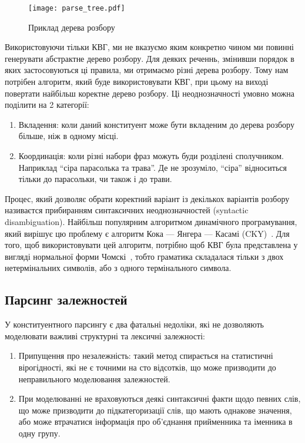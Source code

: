 \begin{wrapfigure}{r}{0.3\textwidth}
 \texttt{[image: parse\_tree.pdf]} 
  \caption{Приклад дерева розбору}
  \label{text:parse_tree}
\end{wrapfigure}

Використовуючи тільки КВГ, ми не вказуємо яким конкретно чином ми повинні генерувати
абстрактне дерево розбору. Для деяких реченнь, змінивши порядок в яких застосовуються ці
правила, ми отримаємо різні дерева розбору. Тому нам потрібен алгоритм, який буде 
використовувати КВГ, при цьому на виході повертати найбільш коректне дерево розбору.
Ці неоднозначності умовно можна поділити на 2 категорії:
\begin{enumerate}
    \item Вкладення: коли даний конституент може бути вкладеним до дерева розбору
    більше, ніж в одному місці.
    \item Координація: коли різні набори фраз можуть буди розділені сполучником.
    Наприклад ``сіра парасолька та трава''. Де не зрозуміло, ``сіра'' відноситься
    тільки до парасольки, чи також і до трави.
\end{enumerate}

Процес, який дозволяє обрати коректний варіант із декількох варіантів розбору називаєтся
прибиранням синтаксичних неоднозначностей (syntactic disambiguation). Найбільш
популярним алгоритмом динамічного програмування, який вирішує цю проблему є
алгоритм Кока — Янгера — Касамі (CKY)~\cite{bib6}. Для того, щоб
використовувати цей алгоритм, потрібно щоб КВГ була представлена у вигляді
нормальної форми Чомскі~\cite{bib7}, тобто граматика складалася тільки
з двох нетермінальних символів, або з одного термінального символа.

\subsection{Парсинг залежностей}
У конституентного парсингу є два фатальні недоліки, які не дозволяють
моделювати важливі структурні та лексичні залежності:
\begin{enumerate}
    \item Припущення про незалежність: такий метод спирається на статистичні
    вірогідності, які не є точними на сто відсотків, що може призводити до
    неправильного моделювання залежностей.
    \item При моделюванні не враховуються деякі синтаксичні факти щодо певних слів,
    що може призводити до підкатегоризації слів, що мають однакове значення,
    або може втрачатися інформація про об'єднання прийменника та іменника
    в одну групу.
\end{enumerate}


